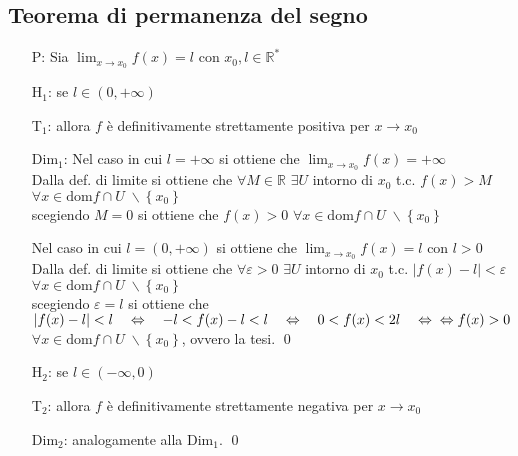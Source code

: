 \documentclass[a4paper]{article}
\newcommand\dom{\text{dom}}
\begin{document}
\subsection{Teorema di permanenza del segno}
\begin{itemize}
	\item[P:] Sia \(\displaystyle \lim_{x \to x_0} f(x) = l\) con \(x_0, l \in \mathbb{R}^*\)
	\item[H\(_1\):] se \(l \in \left( 0, + \infty \right)\)
	\item[T\(_1\):] allora \(f\) è definitivamente strettamente positiva per \(x \to x_0\)
	\item[Dim\(_1\):] Nel caso in cui \(l = + \infty\) si ottiene che \(\displaystyle \lim_{x \to x_0} f(x) = + \infty\) \\
	Dalla def. di limite si ottiene che \(\forall M \in \mathbb{R}\) \(\exists U\) intorno di \(x_0\) t.c. \(f(x) > M\) \(\forall x \in \dom f \cap U \; \backslash \left\{ x_0 \right\}\) \\
	scegiendo \(M = 0\) si ottiene che \(f(x) > 0\) \(\forall x \in \dom f \cap U \; \backslash \left\{ x_0 \right\}\)
	\item[] Nel caso in cui \(l = \left( 0, + \infty \right)\) si ottiene che \(\displaystyle \lim_{x \to x_0} f(x) = l\) con \(l > 0\) \\
	Dalla def. di limite si ottiene che \(\forall \varepsilon > 0\) \(\exists U\) intorno di \(x_0\) t.c. \(\left| f(x) - l \right| < \varepsilon\) \(\forall x \in \dom f \cap U \; \backslash \left\{ x_0 \right\}\) \\
	scegiendo \(\varepsilon = l\) si ottiene che \(\left| f(x) - l \right| < l \quad \Leftrightarrow \quad -l < f(x) - l < l \quad \Leftrightarrow \quad 0 < f(x) < 2l \quad \Leftrightarrow \\
	\Leftrightarrow f(x) > 0\) \(\forall x \in \dom f \cap U \; \backslash \left\{ x_0 \right\}\), ovvero la tesi. \qed

	\item[H\(_2\):] se \(l \in \left( - \infty, 0 \right)\)
	\item[T\(_2\):] allora \(f\) è definitivamente strettamente negativa per \(x \to x_0\)
	\item[Dim\(_2\):] analogamente alla Dim\(_1\). \qed
\end{itemize}
\end{document}
